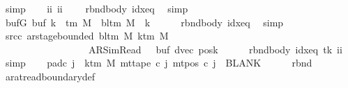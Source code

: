 \begin{isabellebody}
\ simp\isanewline
\ \ \isamarkupfalse%
\ ii{}{\isacharcolon}{\kern0pt}\ {\isachardoublequoteopen}ii\ {\isacharequal}{\kern0pt}\ {}{\isachardoublequoteclose}\ \isamarkupfalse%
\ rbnd{\isacharunderscore}{\kern0pt}body\ idx{\isacharunderscore}{\kern0pt}eq\ \isamarkupfalse%
\ simp\isanewline
\ \ \isamarkupfalse%
\ bufG{\isacharcolon}{\kern0pt}\ {\isachardoublequoteopen}buf{}\ k\ {\isasymin}\ {\isasymGamma}{\isacharunderscore}{\kern0pt}tm\ M\ {\isasymunion}\ {\isacharbraceleft}{\kern0pt}bl{\isacharunderscore}{\kern0pt}tm\ M{\isacharbraceright}{\kern0pt}{\isachardoublequoteclose}\ \ k\isanewline
\ \ \ \ \isamarkupfalse%
\ rbnd{\isacharunderscore}{\kern0pt}body\ idx{\isacharunderscore}{\kern0pt}eq\ \isamarkupfalse%
\ simp\isanewline
\ \ \isamarkupfalse%
\ src{\isacharunderscore}{\kern0pt}c{\isacharprime}{\kern0pt}{\isacharcolon}{\kern0pt}\ {\isachardoublequoteopen}ar{\isacharunderscore}{\kern0pt}stage{\isacharunderscore}{\kern0pt}bounded\ {\isacharparenleft}{\kern0pt}bl{\isacharunderscore}{\kern0pt}tm\ M{\isacharparenright}{\kern0pt}\ {\isacharparenleft}{\kern0pt}k{\isacharunderscore}{\kern0pt}tm\ M{\isacharparenright}{\kern0pt}\isanewline
\ \ \ \ \ \ \ \ \ \ \ \ \ \ \ \ \ \ {\isacharparenleft}{\kern0pt}AR{\isacharunderscore}{\kern0pt}SimRead{\isacharcomma}{\kern0pt}\ {}{\isacharcomma}{\kern0pt}\ {}{\isacharcomma}{\kern0pt}\ buf{}{\isacharcomma}{\kern0pt}\ dvec{\isacharcomma}{\kern0pt}\ posk{}{\isacharparenright}{\kern0pt}{\isachardoublequoteclose}\isanewline
\ \ \ \ \isamarkupfalse%
\ rbnd{\isacharunderscore}{\kern0pt}body\ idx{\isacharunderscore}{\kern0pt}eq\ tk{}\ ii{}\ \isamarkupfalse%
\ simp\isanewline
\ \ \isamarkupfalse%
\ pad{\isacharunderscore}{\kern0pt}c{\isacharprime}{\kern0pt}{\isacharcolon}{\kern0pt}\ {\isachardoublequoteopen}{\isasymforall}j\ {\isasymge}\ k{\isacharunderscore}{\kern0pt}tm\ M{\isachardot}{\kern0pt}\ mt{\isacharunderscore}{\kern0pt}tape\ c{\isacharprime}{\kern0pt}\ j\ {\isacharparenleft}{\kern0pt}mt{\isacharunderscore}{\kern0pt}pos\ c{\isacharprime}{\kern0pt}\ j{\isacharparenright}{\kern0pt}\ {\isacharequal}{\kern0pt}\ BLANK{}{\isachardoublequoteclose}\isanewline
\ \ \ \ \isamarkupfalse%
\ rbnd\ \isamarkupfalse%
\ ar{\isacharunderscore}{\kern0pt}at{\isacharunderscore}{\kern0pt}read{\isacharunderscore}{\kern0pt}boundary{\isacharunderscore}{\kern0pt}def\ \isamarkupfalse%

\end{isabellebody}
